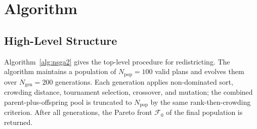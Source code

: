 \section{Algorithm}
\label{sec:algorithm}

\subsection{High-Level Structure}

Algorithm~\ref{alg:nsga2} gives the top-level \nsga{} procedure for
redistricting.
The algorithm maintains a population of $N_{\mathrm{pop}} = 100$ valid plans
and evolves them over $N_{\mathrm{gen}} = 200$ generations.
Each generation applies non-dominated sort, crowding distance, tournament
selection, crossover, and mutation; the combined parent-plus-offspring pool is
truncated to $N_{\mathrm{pop}}$ by the same rank-then-crowding criterion.
After all generations, the Pareto front $\mathcal{F}_0$ of the final population
is returned.

